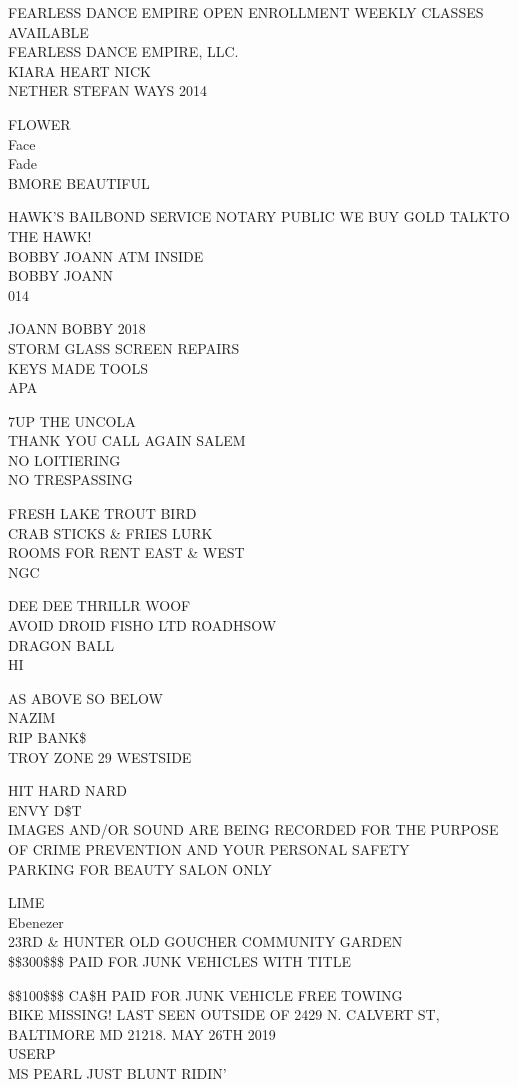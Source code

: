 \documentclass[10pt,letterpaper]{article}
\begin{document}
FEARLESS DANCE EMPIRE OPEN ENROLLMENT WEEKLY CLASSES AVAILABLE\\
FEARLESS DANCE EMPIRE, LLC.\\
KIARA HEART NICK\\
NETHER STEFAN WAYS 2014

FLOWER\\
Face\\
Fade\\
BMORE BEAUTIFUL

HAWK'S BAILBOND SERVICE NOTARY PUBLIC WE BUY GOLD TALKTO THE HAWK!\\
BOBBY JOANN ATM INSIDE\\
BOBBY JOANN\\
014

JOANN BOBBY 2018\\
STORM GLASS SCREEN REPAIRS\\
KEYS MADE TOOLS\\
APA

7UP THE UNCOLA\\
THANK YOU CALL AGAIN SALEM\\
NO LOITIERING\\
NO TRESPASSING

FRESH LAKE TROUT BIRD\\
CRAB STICKS \& FRIES LURK\\
ROOMS FOR RENT EAST \& WEST\\
NGC

DEE DEE THRILLR WOOF\\
AVOID DROID FISHO LTD ROADHSOW\\
DRAGON BALL\\
HI

AS ABOVE SO BELOW\\
NAZIM\\
RIP BANK\$\\
TROY ZONE 29 WESTSIDE

HIT HARD NARD\\
ENVY D\$T\\
IMAGES AND/OR SOUND ARE BEING RECORDED FOR THE PURPOSE OF CRIME PREVENTION AND YOUR PERSONAL SAFETY\\
PARKING FOR BEAUTY SALON ONLY

LIME\\
Ebenezer\\
23RD \& HUNTER OLD GOUCHER COMMUNITY GARDEN\\
\$\$300\$\$\$ PAID FOR JUNK VEHICLES WITH TITLE

\$\$100\$\$\$ CA\$H PAID FOR JUNK VEHICLE FREE TOWING\\
BIKE MISSING!  LAST SEEN OUTSIDE OF 2429 N. CALVERT ST, BALTIMORE MD 21218.  MAY 26TH 2019\\
USERP\\
MS PEARL JUST BLUNT RIDIN'
\end{document}
